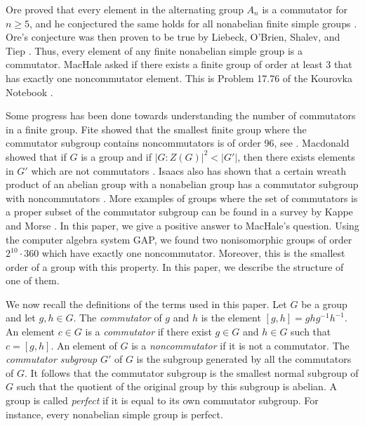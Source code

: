 \documentclass[11pt,twoside]{amsart}
\numberwithin{equation}{section}
\begin{document}
Ore proved that every element in the alternating group $A_n$ is a commutator for $n\geq 5$, and he conjectured the same holds for all nonabelian finite simple groups \cite{Ore1951}. Ore's conjecture was then proven to be true by Liebeck, O'Brien, Shalev, and Tiep \cite{Liebeck2010}. Thus, every element of any finite nonabelian simple group is a commutator. MacHale asked if there exists a finite group of order at least 3 that has exactly one noncommutator element. This is Problem 17.76 of the Kourovka Notebook \cite{khukhro2024unsolvedproblemsgrouptheory}. 

Some progress has been done towards understanding the number of commutators in a finite group. Fite showed that the smallest finite group where the commutator subgroup contains noncommutators is of order 96, see \cite{Fite1902}. Macdonald showed that if $G$ is a group and if $|G:Z(G)|^2 <|G'|$, then there exists elements in $G'$ which are not commutators \cite{Macdonald1986}. Isaacs also has shown that a certain wreath product of an abelian group with a nonabelian group has a commutator subgroup with noncommutators \cite{Isaacs1977}. More examples of groups  where the set of commutators is a proper subset of the commutator subgroup can be found in a survey by Kappe and Morse \cite{Kappe2005}. In this paper, we give a positive answer to MacHale's question. Using the computer algebra system GAP, we found two nonisomorphic groups of order $2^{10}\cdot 360$ which have exactly one noncommutator. Moreover, this is the smallest order of a group with this property. In this paper, we describe the structure of one of them.

We now recall the definitions of the terms used in this paper. Let $G$ be a group and let $g,h\in G$. The \textit{commutator} of $g$ and $h$ is the element $[g,h]=ghg^{-1}h^{-1}$. An element $c\in G$ is a \textit{commutator} if there exist $g\in G$ and $h\in G$ such that $c=[g,h]$. An element of $G$ is a \textit{noncommutator} if it is not a commutator. The \textit{commutator subgroup} $G'$ of $G$ is the subgroup generated by all the commutators of $G$. It follows that the commutator subgroup is the smallest normal subgroup of $G$ such that the quotient of the original group by this subgroup is abelian. A group is called \textit{perfect} if it is equal to its own commutator subgroup. For instance, every nonabelian simple group is perfect.
\end{document}
